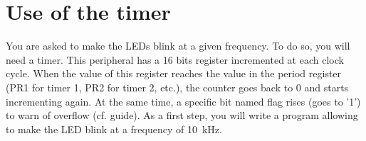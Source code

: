 \documentclass[11pt,a4paper]{article}
\theoremstyle{definition}%
\begin{document}



\section{Use of the timer}
You are asked to make the LEDs blink at a given frequency.
To do so, you will need a timer.
This peripheral has a 16 bits register incremented at each clock cycle.
When the value of this register reaches the value in the period register (PR1 for timer 1, PR2 for timer 2, etc.), the counter goes back to 0 and starts incrementing again.
At the same time, a specific bit named flag rises (goes to '1') to warn of overflow (cf. guide).
As a first step, you will write a program allowing to make the LED blink at a frequency of 10~kHz.
\end{document}
